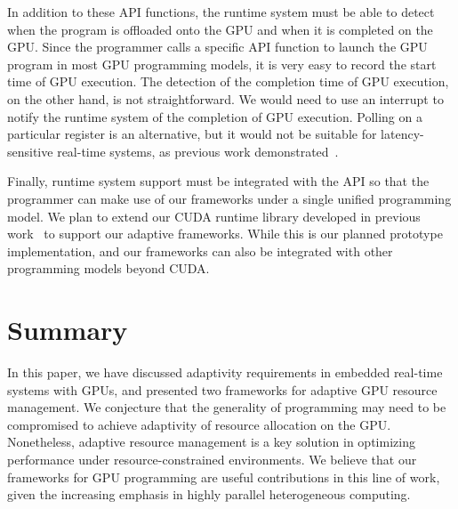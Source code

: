 \documentclass[times, 10pt, twocolumn]{article}
\begin{document}
In addition to these API functions, the runtime system must be able to
detect when the program is offloaded onto the GPU and when it is
completed on the GPU.
Since the programmer calls a specific API function to launch the GPU
program in most GPU programming models, it is very easy to record the
start time of GPU execution.
The detection of the completion time of GPU execution, on the other hand, is
not straightforward.
We would need to use an interrupt to notify the runtime system of
the completion of GPU execution.
Polling on a particular register is an alternative, but it
would not be suitable for latency-sensitive real-time systems, as
previous work demonstrated~\cite{Kato_ATC11}.

Finally, runtime system support must be integrated with the API so that
the programmer can make use of our frameworks under a single unified
programming model.
We plan to extend our CUDA runtime library developed in previous
work~\cite{Kato_OSPERT11} to support our adaptive frameworks.
While this is our planned prototype implementation, and our frameworks can also be
integrated with other programming models beyond CUDA.

\section{Summary}
\label{sec:summary}

In this paper, we have discussed adaptivity requirements in embedded
real-time systems with GPUs, and presented two frameworks for adaptive
GPU resource management.
We conjecture that the generality of programming may need to be compromised
to achieve adaptivity of resource allocation on the GPU.
Nonetheless, adaptive resource management is a key solution in
optimizing performance under resource-constrained environments.
We believe that our frameworks for GPU programming are useful
contributions in this line of work, given the increasing emphasis in 
highly parallel heterogeneous computing.


{\footnotesize

}
\end{document}
